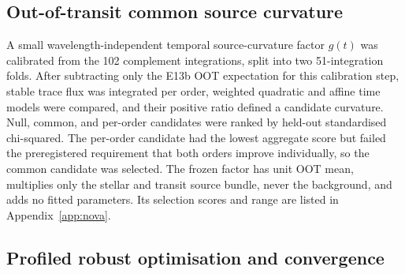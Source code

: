 \subsection{Out-of-transit common source curvature}


A small wavelength-independent temporal source-curvature factor $g(t)$ was
calibrated from the 102 complement integrations, split into two 51-integration
folds. After subtracting only the E13b OOT expectation for this calibration
step, stable trace flux was integrated per order, weighted quadratic and
affine time models were compared, and their positive ratio defined a
candidate curvature. Null, common, and per-order candidates were ranked by
held-out standardised chi-squared. The per-order candidate had the lowest
aggregate score but failed the preregistered requirement that both orders
improve individually, so the common candidate was selected. The frozen
factor has unit OOT mean, multiplies only the stellar and transit source
bundle, never the background, and adds no fitted parameters. Its selection
scores and range are listed in Appendix~\ref{app:nova}.

\subsection{Profiled robust optimisation and convergence}


